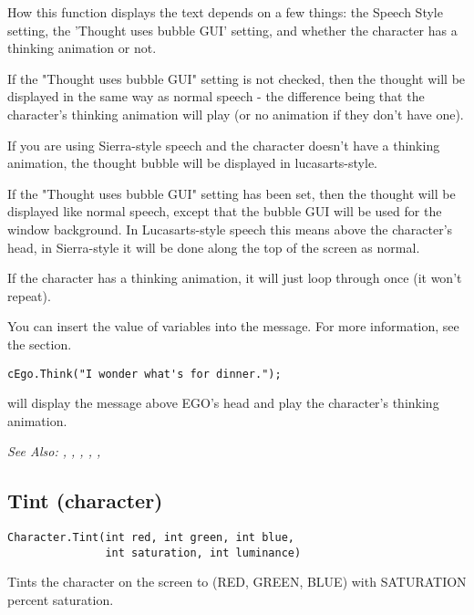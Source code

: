 How this function displays the text depends on a few things: the Speech Style
setting, the 'Thought uses bubble GUI' setting, and whether the character has a thinking
animation or not.

If the "Thought uses bubble GUI" setting is not checked, then the thought will be displayed
in the same way as normal speech - the difference being that the character's thinking animation
will play (or no animation if they don't have one).

If you are using Sierra-style speech and the character doesn't have a thinking animation,
the thought bubble will be displayed in lucasarts-style.

If the "Thought uses bubble GUI" setting has been set, then the thought will be displayed
like normal speech, except that the bubble GUI will be used for the window background.
In Lucasarts-style speech this means above the character's head, in Sierra-style it will
be done along the top of the screen as normal.

If the character has a thinking animation, it will just loop through once (it won't repeat).

You can insert the value of variables into the message. For more information,
see the  section.

\begin{verbatim}
cEgo.Think("I wonder what's for dinner.");
\end{verbatim}
will display the message above EGO's head and play the character's thinking animation.

\it{See Also:} ,
,
,
,
,


\subsection{Tint (character)}\label{Character.Tint}%

\begin{verbatim}
Character.Tint(int red, int green, int blue,
               int saturation, int luminance)
\end{verbatim}

Tints the character on the screen to (RED, GREEN, BLUE) with SATURATION percent
saturation.

